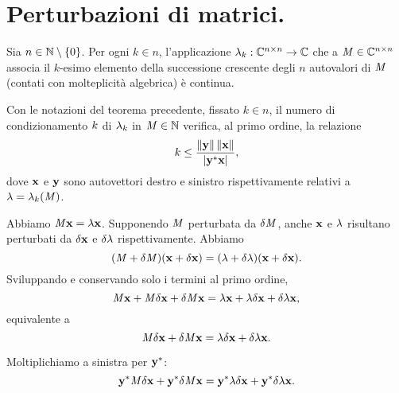 \section{Perturbazioni di matrici.}
\label{CalcoloScientifico_PerturbazioniDiMatrici}
\begin{Theorem}
  Sia $n \in \mathbb{N} \setminus \lbrace 0 \rbrace$.
  Per ogni $k \in n$, l'applicazione
  $\lambda_k: \mathbb{C}^{n \times n} \rightarrow \mathbb{C}$
  che a $\mathit{M} \in \mathbb{C}^{n \times n}$ associa il $k$-esimo
  elemento della successione crescente degli $n$ autovalori di $\mathit{M}$
  (contati con molteplicit\`a algebrica) \`e continua.
\end{Theorem}
\begin{Theorem}
  Con le notazioni del teorema precedente, fissato $k \in n$,
  il numero di condizionamento $k$ di $\lambda_k$ in
  $\mathit{M} \in \mathbb{N}$ verifica, al primo ordine, la relazione
  \[
    \ConditionNumber \leq
    \frac{\Norm{\VarEigenvector}\Norm{\Eigenvector}}{
      \AbsoluteValue{\HermitianTransposed{\VarEigenvector}\Eigenvector}},
  \]
  dove $\Eigenvector$ e $\VarEigenvector$ sono autovettori destro e sinistro
  rispettivamente relativi a $\lambda = \lambda_k(\mathit{M})$.
\end{Theorem}
\Proof Abbiamo $\Matrix \Eigenvector = \Eigenvalue \Eigenvector$.
Supponendo $\mathit{M}$ perturbata da $\Perturbation{\Matrix}$, anche
$\Eigenvector$ e $\lambda$ risultano perturbati da
$\Perturbation{\Eigenvector}$ e
$\Perturbation{\Eigenvalue}$ rispettivamente. Abbiamo
\[
  (\Matrix + \Perturbation{\Matrix})(\Eigenvector + \Perturbation{\Eigenvector})
  = (\Eigenvalue + \Perturbation{\Eigenvalue})
    (\Eigenvector + \Perturbation{\Eigenvector}).
\]
Sviluppando e conservando solo i termini al primo ordine,
\[
  \Matrix\Eigenvector
  + \Matrix \Perturbation{\Eigenvector}
  + \Perturbation{\Matrix}\Eigenvector
  = \Eigenvalue\Eigenvector
  + \Eigenvalue\Perturbation{\Eigenvector}
  + \Perturbation{\Eigenvalue}\Eigenvector,
\]
equivalente a
\[
  \Matrix \Perturbation{\Eigenvector}
  + \Perturbation{\Matrix}\Eigenvector
  = \Eigenvalue\Perturbation{\Eigenvector}
  + \Perturbation{\Eigenvalue}\Eigenvector.
\]
\par Moltiplichiamo a sinistra per $\HermitianTransposed{\VarEigenvector}$:
\[
  \HermitianTransposed{\VarEigenvector} \Matrix \Perturbation{\Eigenvector}
  + \HermitianTransposed{\VarEigenvector} \Perturbation{\Matrix}\Eigenvector
  = \HermitianTransposed{\VarEigenvector} \Eigenvalue\Perturbation{\Eigenvector}
  +\HermitianTransposed{\VarEigenvector} \Perturbation{\Eigenvalue}\Eigenvector.
\]
